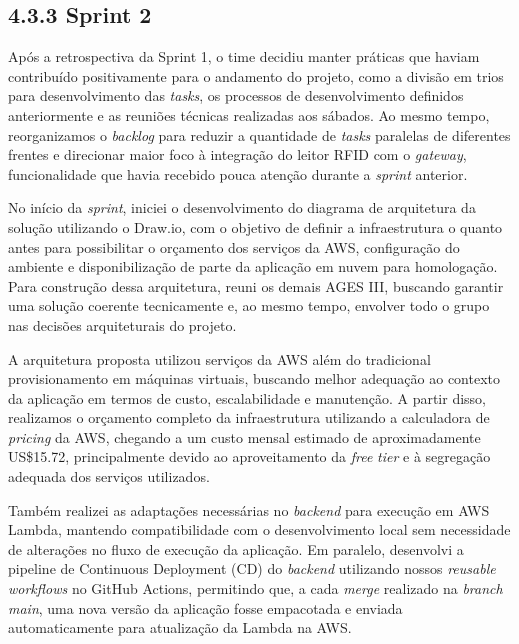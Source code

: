 \hypertarget{__RefHeading___Toc4819_3118176633}{}
\subsection*{4.3.3 Sprint 2}
\label{unit:ages-iii-sprint-2}
\indent \originaltab{}Após a retrospectiva da Sprint 1, o time decidiu manter práticas que haviam contribuído positivamente para o andamento do projeto, como a divisão em trios para desenvolvimento das \textit{tasks}, os processos de desenvolvimento definidos anteriormente e as reuniões técnicas realizadas aos sábados. Ao mesmo tempo, reorganizamos o \textit{backlog} para reduzir a quantidade de \textit{tasks} paralelas de diferentes frentes e direcionar maior foco à integração do leitor RFID com o \textit{gateway}, funcionalidade que havia recebido pouca atenção durante a \textit{sprint} anterior.\par

\indent No início da \textit{sprint}, iniciei o desenvolvimento do diagrama de arquitetura da solução utilizando o Draw.io, com o objetivo de definir a infraestrutura o quanto antes para possibilitar o orçamento dos serviços da AWS, configuração do ambiente e disponibilização de parte da aplicação em nuvem para homologação. Para construção dessa arquitetura, reuni os demais AGES III, buscando garantir uma solução coerente tecnicamente e, ao mesmo tempo, envolver todo o grupo nas decisões arquiteturais do projeto.\par

\indent A arquitetura proposta utilizou serviços da AWS além do tradicional provisionamento em máquinas virtuais, buscando melhor adequação ao contexto da aplicação em termos de custo, escalabilidade e manutenção. A partir disso, realizamos o orçamento completo da infraestrutura utilizando a calculadora de \textit{pricing} da AWS, chegando a um custo mensal estimado de aproximadamente US\$15.72, principalmente devido ao aproveitamento da \textit{free} \textit{tier} e à segregação adequada dos serviços utilizados.\par

\indent Também realizei as adaptações necessárias no \textit{backend} para execução em AWS Lambda, mantendo compatibilidade com o desenvolvimento local sem necessidade de alterações no fluxo de execução da aplicação. Em paralelo, desenvolvi a pipeline de Continuous Deployment (CD) do \textit{backend} utilizando nossos \textit{reusable workflows} no GitHub Actions, permitindo que, a cada \textit{merge} realizado na \textit{branch} \textit{main}, uma nova versão da aplicação fosse empacotada e enviada automaticamente para atualização da Lambda na AWS.\par

